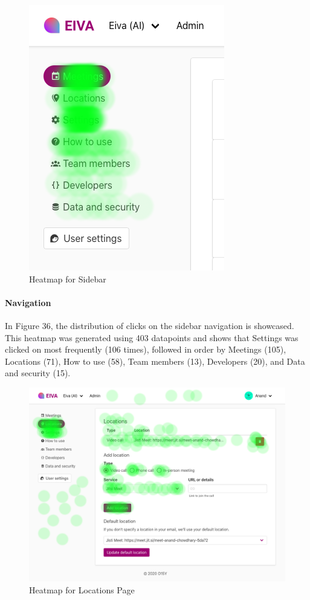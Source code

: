 \documentclass{article}
\begin{document}
\begin{figure}\centering
	\includegraphics[scale=0.5]{heatmap-sidebar.png}
	\caption{Heatmap for Sidebar}
\end{figure}

\paragraph{Navigation}

In Figure 36, the distribution of clicks on the sidebar navigation is showcased. This heatmap was generated using 403 datapoints and shows that Settings was clicked on most frequently (106 times), followed in order by Meetings (105), Locations (71), How to use (58), Team members (13), Developers (20), and Data and security (15).

\begin{figure}[h]
	\includegraphics[width=\textwidth]{heatmap-locations.png}
	\caption{Heatmap for Locations Page}
\end{figure}
\end{document}
